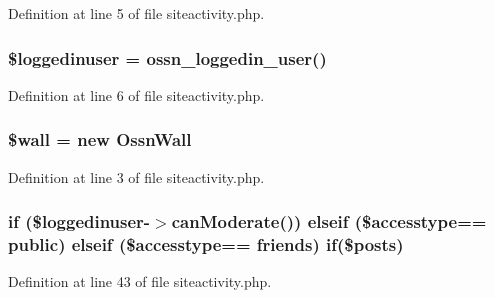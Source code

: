 Definition at line 5 of file siteactivity.\+php.

\subsubsection[{\texorpdfstring{\$loggedinuser}{$loggedinuser}}]{\setlength{\rightskip}{0pt plus 5cm}\$loggedinuser = {\bf ossn\+\_\+loggedin\+\_\+user}()}\hypertarget{siteactivity_8php_a4c0724683a2226d71f87cc5908fe1dfe}{}\label{siteactivity_8php_a4c0724683a2226d71f87cc5908fe1dfe}


Definition at line 6 of file siteactivity.\+php.

\subsubsection[{\texorpdfstring{\$wall}{$wall}}]{\setlength{\rightskip}{0pt plus 5cm}\$wall = new {\bf Ossn\+Wall}}\hypertarget{siteactivity_8php_a79db619dde07aaf30162c97aeb68cdff}{}\label{siteactivity_8php_a79db619dde07aaf30162c97aeb68cdff}


Definition at line 3 of file siteactivity.\+php.

\subsubsection[{\texorpdfstring{if}{if}}]{\setlength{\rightskip}{0pt plus 5cm}if (\$loggedinuser-\/$>$can\+Moderate()) {\bf elseif} (\$accesstype== \textquotesingle{}public\textquotesingle{}) {\bf elseif} (\$accesstype== \textquotesingle{}friends\textquotesingle{}) if(\$posts)}\hypertarget{siteactivity_8php_a902b6a5cdec3d39dbcef4cf35d4a2a30}{}\label{siteactivity_8php_a902b6a5cdec3d39dbcef4cf35d4a2a30}


Definition at line 43 of file siteactivity.\+php.

